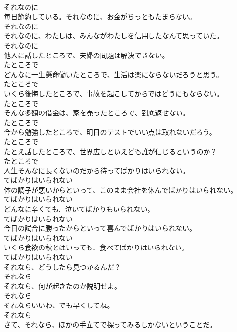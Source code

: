 \documentclass[8pt]{extreport}
\begin{document}
\begin{CJK}{UTF8}{min}
\\	それなのに	
\\	毎日節約している。それなのに、お金がちっともたまらない。	
\\	それなのに	
\\	それなのに、わたしは、みんながわたしを信用したなんて思っていた。	
\\	それなのに	
\\	他人に話したところで、夫婦の問題は解決できない。	
\\	たところで	
\\	どんなに一生懸命働いたところで、生活は楽にならないだろうと思う。	
\\	たところで	
\\	いくら後悔したところで、事故を起こしてからではどうにもならない。	
\\	たところで	
\\	そんな多額の借金は、家を売ったところで、到底返せない。	
\\	たところで	
\\	今から勉強したところで、明日のテストでいい点は取れないだろう。	
\\	たところで	
\\	たとえ話したところで、世界広しといえども誰が信じるというのか？	
\\	たところで	
\\	人生そんなに長くないのだから待ってばかりはいられない。	
\\	てばかりはいられない	
\\	体の調子が悪いからといって、このまま会社を休んでばかりはいられない。	
\\	てばかりはいられない	
\\	どんなに辛くても、泣いてばかりもいられない。	
\\	てばかりはいられない	
\\	今日の試合に勝ったからといって喜んでばかりはいられない。	
\\	てばかりはいられない	
\\	いくら食欲の秋とはいっても、食べてばかりはいられない。	
\\	てばかりはいられない	
\\	それなら、どうしたら見つかるんだ？	
\\	それなら	
\\	それなら、何が起きたのか説明せよ。	
\\	それなら	
\\	それならいいわ、でも早くしてね。	
\\	それなら	
\\	さて、それなら、ほかの手立てで探ってみるしかないということだ。	

\end{CJK}
\end{document}
